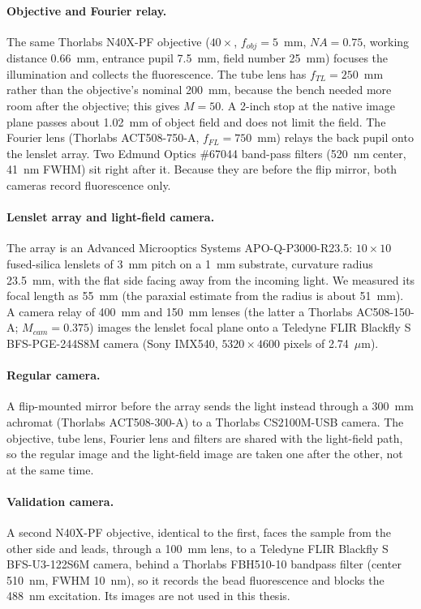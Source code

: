 \paragraph{Objective and Fourier relay.} The same Thorlabs N40X-PF objective ($40\times$, $f_{obj}=5$~mm, $NA=0.75$, working distance 0.66~mm, entrance pupil 7.5~mm, field number 25~mm) focuses the illumination and collects the fluorescence. The tube lens has $f_{TL}=250$~mm rather than the objective's nominal 200~mm, because the bench needed more room after the objective; this gives $M=50$. A 2-inch stop at the native image plane passes about 1.02~mm of object field and does not limit the field. The Fourier lens (Thorlabs ACT508-750-A, $f_{FL}=750$~mm) relays the back pupil onto the lenslet array. Two Edmund Optics \#67044 band-pass filters (520~nm center, 41~nm FWHM) sit right after it. Because they are before the flip mirror, both cameras record fluorescence only.

\paragraph{Lenslet array and light-field camera.} The array is an Advanced Microoptics Systems APO-Q-P3000-R23.5: $10\times10$ fused-silica lenslets of 3~mm pitch on a 1~mm substrate, curvature radius 23.5~mm, with the flat side facing away from the incoming light. We measured its focal length as 55~mm (the paraxial estimate from the radius is about 51~mm). A camera relay of 400~mm and 150~mm lenses (the latter a Thorlabs AC508-150-A; $M_{cam}=0.375$) images the lenslet focal plane onto a Teledyne FLIR Blackfly S BFS-PGE-244S8M camera (Sony IMX540, $5320\times4600$ pixels of 2.74~$\mu$m).

\paragraph{Regular camera.} A flip-mounted mirror before the array sends the light instead through a 300~mm achromat (Thorlabs ACT508-300-A) to a Thorlabs CS2100M-USB camera. The objective, tube lens, Fourier lens and filters are shared with the light-field path, so the regular image and the light-field image are taken one after the other, not at the same time.

\paragraph{Validation camera.} A second N40X-PF objective, identical to the first, faces the sample from the other side and leads, through a 100~mm lens, to a Teledyne FLIR Blackfly S BFS-U3-122S6M camera, behind a Thorlabs FBH510-10 bandpass filter (center 510~nm, FWHM 10~nm), so it records the bead fluorescence and blocks the 488~nm excitation. Its images are not used in this thesis.

